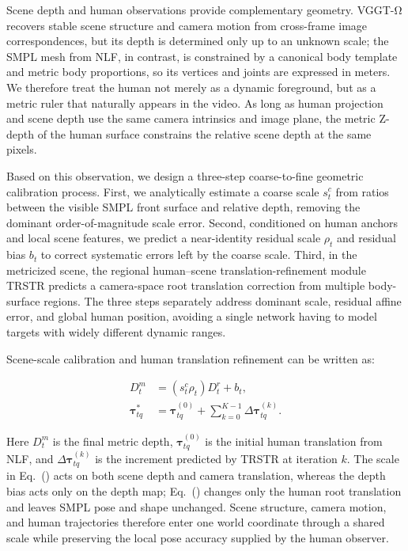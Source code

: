 \documentclass{article}
\begin{document}
Scene depth and human observations provide complementary geometry. VGGT-Ω recovers stable scene structure and camera motion from cross-frame image correspondences, but its depth is determined only up to an unknown scale; the SMPL mesh from NLF, in contrast, is constrained by a canonical body template and metric body proportions, so its vertices and joints are expressed in meters. We therefore treat the human not merely as a dynamic foreground, but as a metric ruler that naturally appears in the video. As long as human projection and scene depth use the same camera intrinsics and image plane, the metric Z-depth of the human surface constrains the relative scene depth at the same pixels.

Based on this observation, we design a three-step coarse-to-fine geometric calibration process. First, we analytically estimate a coarse scale $s_t^c$ from ratios between the visible SMPL front surface and relative depth, removing the dominant order-of-magnitude scale error. Second, conditioned on human anchors and local scene features, we predict a near-identity residual scale $\rho_t$ and residual bias $b_t$ to correct systematic errors left by the coarse scale. Third, in the metricized scene, the regional human--scene translation-refinement module TRSTR predicts a camera-space root translation correction from multiple body-surface regions. The three steps separately address dominant scale, residual affine error, and global human position, avoiding a single network having to model targets with widely different dynamic ranges.

Scene-scale calibration and human translation refinement can be written as:

\begin{align}
D_t^m &= (s_t^c\rho_t)D_t^r+b_t, \label{eq:metric-depth-overview}\\
\boldsymbol{\tau}_{tq}^{*}
&= \boldsymbol{\tau}_{tq}^{(0)}
+\sum_{k=0}^{K-1}\Delta\boldsymbol{\tau}_{tq}^{(k)}.
\label{eq:translation-overview}
\end{align}

Here $D_t^m$ is the final metric depth, $\boldsymbol{\tau}_{tq}^{(0)}$ is the initial human translation from NLF, and $\Delta\boldsymbol{\tau}_{tq}^{(k)}$ is the increment predicted by TRSTR at iteration $k$. The scale in Eq.~() acts on both scene depth and camera translation, whereas the depth bias acts only on the depth map; Eq.~() changes only the human root translation and leaves SMPL pose and shape unchanged. Scene structure, camera motion, and human trajectories therefore enter one world coordinate through a shared scale while preserving the local pose accuracy supplied by the human observer.
\end{document}
